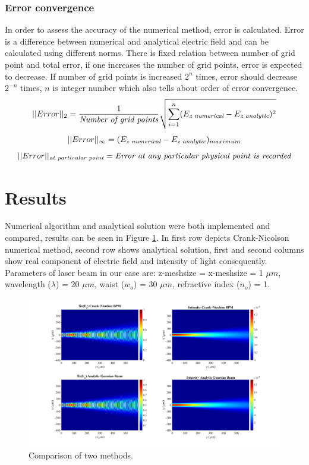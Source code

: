 \documentclass{article}
\begin{document}
	\subsubsection{Error convergence}	
	In order to assess the accuracy of the numerical method, error is calculated. Error is a difference between numerical and analytical electric field and can be calculated using different norms. There is fixed relation between number of grid point and total error, if one increases the number of grid points, error is expected to decrease. If number of grid points is increased $2^n$ times, error should decrease $2^{-n}$ times, $n$ is integer number which also tells about order of error convergence.
	\[||Error||_2 = \frac{1}{\text{{\it Number of grid points}}}\sqrt{\sum\limits_{i=1}^n (E_{\text{\it z numerical}}-E_{\text{\it z analytic}})^2 }
	\]
	\[
	||Error||_\infty = (E_{\text{\it z numerical}}-E_{\text{\it z analytic}})_{maximum}
	\]
	\[ ||Error||_{\text{\it at particular point}} = \text{\it Error at any particular physical point is recorded}
	\]
	\newpage
	\section{Results}
	Numerical algorithm and analytical solution were both implemented and compared, results can be seen in Figure \ref{fig:Results}. In first row depicts Crank-Nicolson numerical method, second row shows analytical solution, first and second columns show real component of electric field and intensity of light consequently. Parameters of laser beam in our case are: z-meshsize = x-meshsize  = 1 $\mu m$, wavelength ($\lambda$) = 20 $\mu m$, waist ($w_o$) = 30 $\mu m$, refractive index ($n_o$) = 1.	
	\begin{figure}[h!]
		\hspace{-30mm}
		\includegraphics[width=1.5\textwidth]{N1.jpg}
		\caption{\label{fig:Results}Comparison of two methods.}
	\end{figure}
\end{document}

